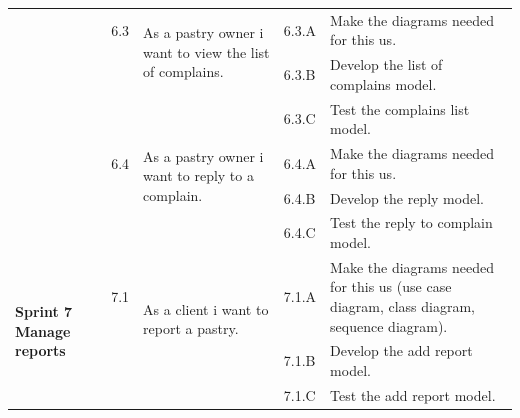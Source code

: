 \documentclass[12pt,a4paper]{report}
\begin{document}
\begin{table}[H]
\begin{center}
\begin{tabular}{|  p{3cm}|  p{1cm}| p{4cm}|  p{1cm}| p{6cm}|}
			&                       
			6.3  &  
			\multirow{2}{4cm}{As a pastry owner i want to view the list of complains.}
			
			&				                      
			6.3.A &                        
			Make the diagrams needed for this \ac{us}.
			\\ 
			\cline{4-5}    
			&                   
			&                                 
			&                        
			6.3.B &                        
			Develop the list of complains model.
			\\ 
			\cline{4-5}    
			&                   
			&                                 
			&                        
			6.3.C &                        
			Test the complains list model.
			\\
			\cline{2-5}  
			
			&                       
			6.4  &  
			\multirow{2}{4cm}{As a pastry owner i want to reply to a complain.}
			
			&				                      
			6.4.A &                        
			Make the diagrams needed for this \ac{us}.
			\\ 
			\cline{4-5}    
			&                   
			&                                 
			&                        
			6.4.B &                        
			Develop the reply model.
			\\ 
			\cline{4-5}    
			&                   
			&                                 
			&                        
			6.4.C &                        
			Test the reply to complain model.
				\\
			\hline
			\multirow{5}{3cm}{\textbf{Sprint 7} \textbf{Manage reports} }
			&                       
			7.1  &  
			\multirow{2}{4cm}{As a client i want to report a pastry.}
			
			&				                      
			7.1.A &                        
			Make the diagrams needed for this \ac{us} (use case diagram, class diagram, sequence diagram).
			\\ 
			\cline{4-5}    
			&                   
			&                                 
			&                        
			7.1.B &                        
			Develop the add report model.
			\\ 
			\cline{4-5}    
			&                   
			&                                 
			&                        
			7.1.C &                        
			Test the add report model.
			
			
			
		\end{tabular}
		
	\end{center}
	
\end{table}
\end{document}
